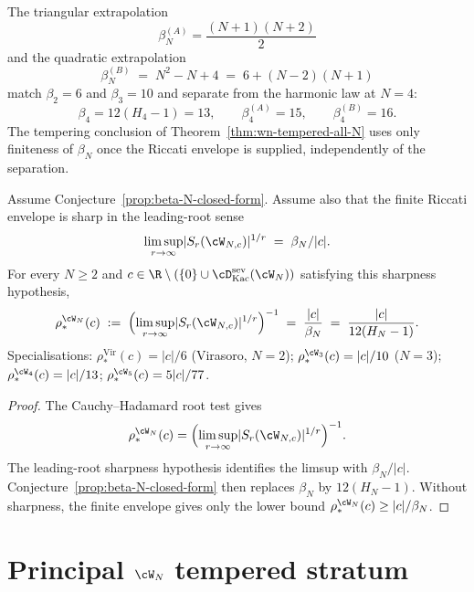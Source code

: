 \begin{remark}[Polynomial candidates separated at $N = 4$]
\label{rem:beta-candidate-discriminator}
The triangular extrapolation
\[
 \beta_N^{(A)}=\frac{(N+1)(N+2)}{2}
\]
and the quadratic extrapolation
\[
 \beta_N^{(B)} \;=\; N^2 - N + 4 \;=\; 6 + (N-2)(N+1)
\]
match $\beta_2=6$ and $\beta_3=10$ and separate from the harmonic law
at $N=4$:
\[
 \beta_4 = 12(H_4-1)=13,
 \qquad
 \beta_4^{(A)}=15,
 \qquad
 \beta_4^{(B)}=16.
\]
The tempering conclusion of
Theorem~\ref{thm:wn-tempered-all-N} uses only finiteness of $\beta_N$
once the Riccati envelope is supplied, independently of the
separation.
\end{remark}

\begin{proposition}
\label{prop:rho-star-WN-closed-form}
\ClaimStatusConditional
Assume Conjecture~\ref{prop:beta-N-closed-form}. Assume also that the
finite Riccati envelope is sharp in the leading-root sense
\[
 \limsup_{r \to \infty} \lvert S_r(\cW_{N,c}) \rvert^{1/r}
 \;=\;
 \beta_N/\lvert c\rvert .
\]
For every $N \ge 2$ and $c \in \R \setminus (\{0\} \cup
\cD^{\mathrm{sev}}_{\mathrm{Kac}}(\cW_N))$ satisfying this sharpness
hypothesis,
\[
 \rho_*^{\cW_N}(c)
 \;:=\;
 \Bigl( \limsup_{r \to \infty} \lvert S_r(\cW_{N,c}) \rvert^{1/r}
 \Bigr)^{-1}
 \;=\;
 \frac{\lvert c \rvert}{\beta_N}
 \;=\;
 \frac{\lvert c\rvert}{12(H_N - 1)}.
\]
Specialisations: $\rho_*^{\mathrm{Vir}}(c) = |c|/6$ (Virasoro,
$N=2$); $\rho_*^{\cW_3}(c) = |c|/10$ ($N=3$);
$\rho_*^{\cW_4}(c)=|c|/13$; $\rho_*^{\cW_5}(c)=5|c|/77$.
\end{proposition}

\begin{proof}
The Cauchy--Hadamard root test gives
\[
 \rho_*^{\cW_N}(c)
 =
 \Bigl(\limsup_{r\to\infty}
 \lvert S_r(\cW_{N,c})\rvert^{1/r}\Bigr)^{-1}.
\]
The leading-root sharpness hypothesis identifies the limsup with
$\beta_N/|c|$. Conjecture~\ref{prop:beta-N-closed-form} then replaces
$\beta_N$ by $12(H_N-1)$. Without sharpness, the finite envelope gives
only the lower bound $\rho_*^{\cW_N}(c)\ge |c|/\beta_N$.
\end{proof}

\section{Principal $\cW_N$ tempered stratum}
\label{sec:wn-dichotomy-healed}

